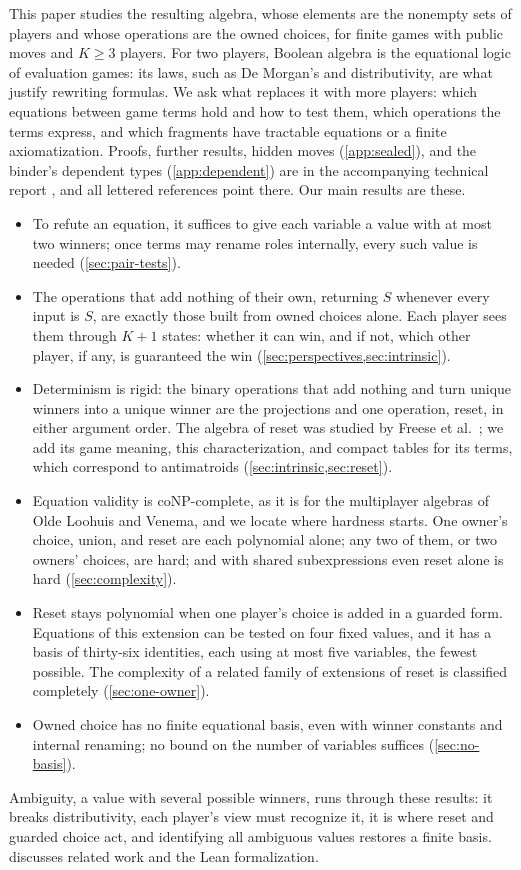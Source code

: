 This paper studies the resulting algebra, whose elements are the nonempty sets of players and whose operations are the owned choices, for finite games with public moves and $K\geq3$ players. For two players, Boolean algebra is the equational logic of evaluation games: its laws, such as De Morgan's and distributivity, are what justify rewriting formulas. We ask what replaces it with more players: which equations between game terms hold and how to test them, which operations the terms express, and which fragments have tractable equations or a finite axiomatization. Proofs, further results, hidden moves (\cref{app:sealed}), and the binder's dependent types (\cref{app:dependent}) are in the accompanying technical report \cite{GershuniOwnedChoiceTR2026}, and all lettered references point there. Our main results are these.
\begin{itemize}
\item To refute an equation, it suffices to give each variable a value with at most two winners; once terms may rename roles internally, every such value is needed (\cref{sec:pair-tests}).
\item The operations that add nothing of their own, returning $S$ whenever every input is $S$, are exactly those built from owned choices alone. Each player sees them through $K+1$ states: whether it can win, and if not, which other player, if any, is guaranteed the win (\cref{sec:perspectives,sec:intrinsic}).
\item Determinism is rigid: the binary operations that add nothing and turn unique winners into a unique winner are the projections and one operation, reset, in either argument order. The algebra of reset was studied by Freese et al.\ \cite{FreeseEtAl2002}; we add its game meaning, this characterization, and compact tables for its terms, which correspond to antimatroids (\cref{sec:intrinsic,sec:reset}).
\item Equation validity is coNP-complete, as it is for the multiplayer algebras of Olde Loohuis and Venema, and we locate where hardness starts. One owner's choice, union, and reset are each polynomial alone; any two of them, or two owners' choices, are hard; and with shared subexpressions even reset alone is hard (\cref{sec:complexity}).
\item Reset stays polynomial when one player's choice is added in a guarded form. Equations of this extension can be tested on four fixed values, and it has a basis of thirty-six identities, each using at most five variables, the fewest possible. The complexity of a related family of extensions of reset is classified completely (\cref{sec:one-owner}).
\item Owned choice has no finite equational basis, even with winner constants and internal renaming; no bound on the number of variables suffices (\cref{sec:no-basis}).
\end{itemize}
Ambiguity, a value with several possible winners, runs through these results: it breaks distributivity, each player's view must recognize it, it is where reset and guarded choice act, and identifying all ambiguous values restores a finite basis.
 discusses related work and the Lean formalization.
